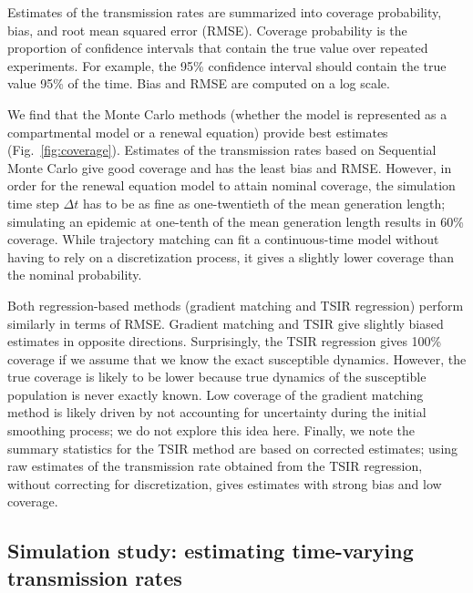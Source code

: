\documentclass{article}
\newcommand{\fref}[1]{Fig.~\ref{fig:#1}}
\begin{document}
Estimates of the transmission rates are summarized into coverage probability, bias, and root mean squared error (RMSE).
Coverage probability is the proportion of confidence intervals that contain the true value over repeated experiments. 
For example, the 95\% confidence interval should contain the true value 95\% of the time.
Bias and RMSE are computed on a log scale.

We find that the Monte Carlo methods (whether the model is represented as a compartmental model or a renewal equation) provide best estimates (\fref{coverage}).
Estimates of the transmission rates based on Sequential Monte Carlo give good coverage and has the least bias and RMSE.
However, in order for the renewal equation model to attain nominal coverage, the simulation time step $\Delta t$ has to be as fine as one-twentieth of the mean generation length; 
simulating an epidemic at one-tenth of the mean generation length results in 60\% coverage.
While trajectory matching can fit a continuous-time model without having to rely on a discretization process, it gives a slightly lower coverage than the nominal probability.

Both regression-based methods (gradient matching and TSIR regression) perform similarly in terms of RMSE.
Gradient matching and TSIR give slightly biased estimates in opposite directions.
Surprisingly, the TSIR regression gives 100\% coverage if we assume that we know the exact susceptible dynamics.
However, the true coverage is likely to be lower because true dynamics of the susceptible population is never exactly known.
Low coverage of the gradient matching method is likely driven by not accounting for uncertainty during the initial smoothing process; we do not explore this idea here.
Finally, we note the summary statistics for the TSIR method are based on corrected estimates; using raw estimates of the transmission rate obtained from the TSIR regression, without correcting for discretization, gives estimates with strong bias and low coverage.

\subsection{Simulation study: estimating time-varying transmission rates}
\end{document}
